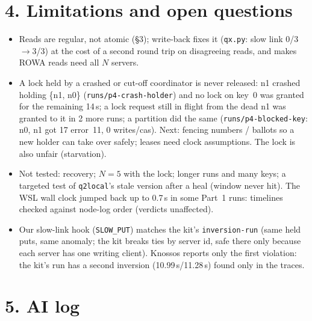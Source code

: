 \documentclass[a4paper,10pt]{article}
\newcommand{\run}[1]{\texttt{runs/#1}}
\begin{document}
\section*{4. Limitations and open questions}

\begin{itemize}
\item Reads are regular, not atomic (\S3); write-back fixes it
  (\texttt{qx.py}: slow link 0/3$\to$3/3) at the cost of a second round
  trip on disagreeing reads, and makes ROWA reads need all $N$ servers.
\item A lock held by a crashed or cut-off coordinator is never released:
  n1 crashed holding \{n1, n0\} (\run{p4-crash-holder}) and no lock on key~0
  was granted for the remaining 14\,s; a lock request still in flight
  from the dead n1 was granted to it in 2 more runs; a partition did the
  same (\run{p4-blocked-key}: n0, n1 got 17 error~11, 0 writes/cas).
  Next: fencing numbers / ballots so a new holder can take over safely;
  leases need clock assumptions. The lock is also unfair (starvation).
\item Not tested: recovery; $N=5$ with the lock; longer runs and many
  keys; a targeted test of \texttt{q2local}'s stale version after a heal
  (window never hit). The WSL wall clock jumped back up to 0.7\,s in some
  Part~1 runs: timelines checked against node-log order (verdicts
  unaffected).
\item Our slow-link hook (\texttt{SLOW\_PUT}) matches the kit's
  \texttt{inversion-run} (same held puts, same anomaly; the kit breaks
  ties by server id, safe there only because each server has one writing
  client). Knossos reports only the first violation: the kit's run has a
  second inversion (10.99\,s/11.28\,s) found only in the traces.
\end{itemize}

\section*{5. AI log}
\end{document}
